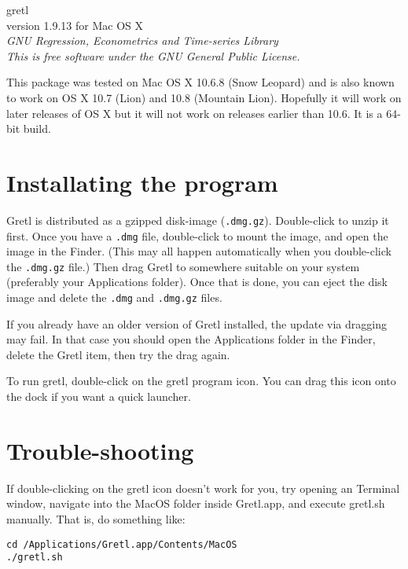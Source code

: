 \documentclass[11pt]{article}
\begin{document}
\begin{center}
{\color{gold} \titlefont gretl} \\[1ex]
version 1.9.13 for Mac OS X \\[2ex]

\textit{GNU Regression, Econometrics and Time-series Library\\
  This is free software under the GNU General Public License.}

\end{center}

This package was tested on Mac OS X 10.6.8 (Snow Leopard) and
is also known to work on OS X 10.7 (Lion) and 10.8 (Mountain Lion).
Hopefully it will work on later releases of OS X but it will
not work on releases earlier than 10.6. It is a 64-bit build.

\section{Installating the program}
\label{sec:install}

\textsf{Gretl} is distributed as a gzipped disk-image
(\texttt{.dmg.gz}).  Double-click to unzip it first.  Once you have a
\texttt{.dmg} file, double-click to mount the image, and open the
image in the Finder. (This may all happen automatically when you
double-click the \texttt{.dmg.gz} file.) Then drag \textsf{Gretl} to
somewhere suitable on your system (preferably your
\textsf{Applications} folder).  Once that is done, you can eject the
disk image and delete the \texttt{.dmg} and \texttt{.dmg.gz} files.

If you already have an older version of \textsf{Gretl} installed, the
update via dragging may fail. In that case you should open the
\textsf{Applications} folder in the Finder, delete the \textsf{Gretl}
item, then try the drag again.

To run gretl, double-click on the gretl program icon.  You can drag
this icon onto the dock if you want a quick launcher.

\section{Trouble-shooting}

If double-clicking on the gretl icon doesn't work for you, try
opening an Terminal window, navigate into the \textsf{MacOS}
folder inside \textsf{Gretl.app}, and execute 
\textsf{gretl.sh} manually.  That is, do something like:

\begin{verbatim}
cd /Applications/Gretl.app/Contents/MacOS
./gretl.sh
\end{verbatim}
\end{document}
